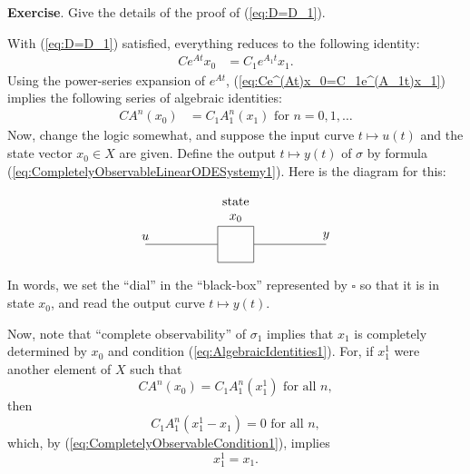 \documentclass[12pt]{book}
\theoremstyle{plain}
\theoremstyle{definition}
\begin{document}
\textbf{Exercise}.
Give the details of the proof of (\ref{eq:D=D_1}).

With (\ref{eq:D=D_1}) satisfied, everything reduces to the following identity:
\begin{align} \label{eq:Ce^(At)x_0=C_1e^(A_1t)x_1}
    Ce^{At}x_0 &= C_1e^{A_1t}x_1.
\end{align}
Using the power-series expansion of $e^{At}$, (\ref{eq:Ce^(At)x_0=C_1e^(A_1t)x_1}) implies the following series of algebraic identities:
\begin{align} \label{eq:AlgebraicIdentities1}
    CA^n(x_0) &= C_1A_1^n(x_1) \text{ for } n = 0, 1, \dots
\end{align}
Now, change the logic somewhat, and suppose the input curve $t \mapsto u(t)$ and the state vector $x_0 \in X$ are given.
Define the output $t \mapsto y(t)$ of $\sigma$ by formula (\ref{eq:CompletelyObservableLinearODESystemy1}).
Here is the diagram for this:

\begin{equation}
\begin{tikzpicture} \label{diag:x_0}
    \node[draw, rectangle, minimum width=1cm, minimum height=1cm] (box) at (0,0) {};
    \node[above] (x0) at (box.north) {$x_0$};
    \node[above] at (x0.north) {state};
    \draw (box.west) -- ++(-2,0) node[above]{$u$};
    \draw (box.east) -- ++(2,0) node[above]{$y$};
\end{tikzpicture}
\end{equation}

In words, we set the ``dial'' in the ``black-box'' represented by $\square$ so that it is in state $x_0$, and read the output curve $t \mapsto y(t)$.

Now, note that ``complete observability'' of $\sigma_1$ implies that $x_1$ is completely determined by $x_0$ and condition (\ref{eq:AlgebraicIdentities1}).
For, if $x_1^1$ were another element of $X$ such that
$$CA^n(x_0) = C_1A_1^n(x_1^1) \text{ for all } n,$$
then
$$C_1A_1^n(x_1^1-x_1) = 0 \text{ for all } n,$$
which, by (\ref{eq:CompletelyObservableCondition1}), implies
$$x_1^1 = x_1.$$
\end{document}

